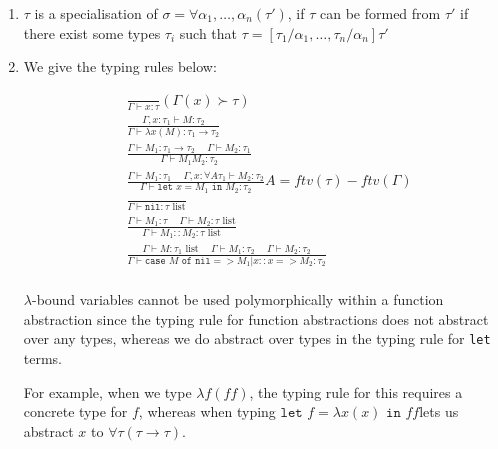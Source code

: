 \documentclass[12pt]{article}
\begin{document}
\begin{enumerate}[label=(\alph*)]
  \item
    $\tau$ is a specialisation of $\sigma = \forall \alpha_1, \ldots, \alpha_n (\tau')$, if $\tau$ can be formed from $\tau'$ if there exist some types $\tau_i$ such that $\tau = [\tau_1 / \alpha_1, \ldots, \tau_n / \alpha_n]\tau'$

  \item
    We give the typing rules below:

    \begingroup
    \addtolength{\jot}{1em}
    \begin{align*}
      &\frac{}{\Gamma \vdash x : \tau}(\Gamma(x) \succ \tau)\\
      &\frac{\Gamma, x : \tau_1 \vdash M : \tau_2}{ \Gamma \vdash \lambda x(M) : \tau_1 \rightarrow \tau_2} \\
      &\frac{\Gamma \vdash M_1 : \tau_1 \rightarrow \tau_2 \hspace{15pt} \Gamma \vdash M_2 : \tau_1}{\Gamma \vdash M_1 M_2 : \tau_2}\\
      &\frac{\Gamma \vdash M_1 : \tau_1 \hspace{15pt} \Gamma, x : \forall A\tau_1 \vdash M_2 : \tau_2}{\Gamma \vdash \texttt{let }x=M_1\texttt{ in }M_2 : \tau_2}A = ftv(\tau) - ftv(\Gamma)\\
      &\frac{}{\Gamma \vdash \texttt{nil} : \tau \text{ list}} \\
      &\frac{\Gamma \vdash M_1 : \tau \hspace{15pt} \Gamma \vdash M_2 : \tau\text{ list}}{\Gamma \vdash M_1 :: M_2 : \tau \text{ list}}\\
      &\frac{\Gamma \vdash M : \tau_1\text{ list} \hspace{15pt} \Gamma \vdash M_1 : \tau_2 \hspace{15pt} \Gamma \vdash M_2 : \tau_2}{\Gamma \vdash \texttt{case }M\texttt{ of nil} => M_1 | x::x => M_2 : \tau_2} \\
    \end{align*}
    \endgroup

    $\lambda$-bound variables cannot be used polymorphically within a function abstraction since the typing rule for function abstractions does not abstract over any types, whereas we do abstract over types  in the typing rule for \texttt{let} terms.

    For example, when we type $\lambda f(f f)$, the typing rule for this requires a concrete type for $f$, whereas when typing $\texttt{let }f=\lambda x(x)\texttt{ in }f f$lets us abstract $x$ to $\forall \tau (\tau \rightarrow \tau)$.


\end{enumerate}
\end{document}
